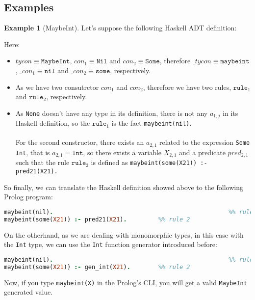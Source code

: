 \documentclass{report}
\theoremstyle{definition}
\newtheorem{example}{Example}[section]
\theoremstyle{definition}
\newcommand{\ttt}[1]{\texttt{#1}}
\begin{document}
\subsection{Examples} \label{ch:monomorphic-types-examples}
\begin{example}[MaybeInt]
	Let's suppose the following Haskell ADT definition:
	
	Here:
	\begin{itemize}
		\item $tycon \equiv \ttt{MaybeInt}$, $con_1 \equiv \ttt{Nil}$ and $con_2 \equiv \ttt{Some}$, therefore $\_tycon \equiv \ttt{maybeint}$, $\_con_1 \equiv \ttt{nil}$ and $\_con_2 \equiv \ttt{some}$, respectively.
		\item As we have two consutrctor $con_1$ and $con_2$, therefore we have two rules, $\ttt{rule}_1$ and $\ttt{rule}_2$, respectively.
		\item As \ttt{None} doesn't have any type in its definition, there is not any $a_{1,j}$ in its Haskell definition, so the $\ttt{rule}_1$ is the fact \ttt{maybeint(nil)}.\\\\
		For the second constructor, there exists an $a_{2,1}$ related to the expression \ttt{Some Int}, that is $a_{2,1} = \ttt{Int}$, so there exists a variable $X_{2,1}$ and a predicate $pred_{2,1}$ such that the rule $\ttt{rule}_2$ is defined as \ttt{maybeint(some(X21)) :- pred21(X21).}
	\end{itemize}
	So finally, we can translate the Haskell definition showed above to the following Prolog program:\\
\begin{lstlisting}[language=Prolog]
maybeint(nil).													%% rule 1
maybeint(some(X21)) :- pred21(X21).			%% rule 2
\end{lstlisting}
On the otherhand, as we are dealing with monomorphic types, in this case with the \ttt{Int} type, we can use the \ttt{Int} function generator introduced before:\\
\begin{lstlisting}[language=Prolog]
maybeint(nil).													%% rule 1
maybeint(some(X21)) :- gen_int(X21).		%% rule 2
\end{lstlisting}
Now, if you type \ttt{maybeint(X)} in the Prolog's CLI, you will get a valid \ttt{MaybeInt} generated value.
\end{example}
\end{document}
